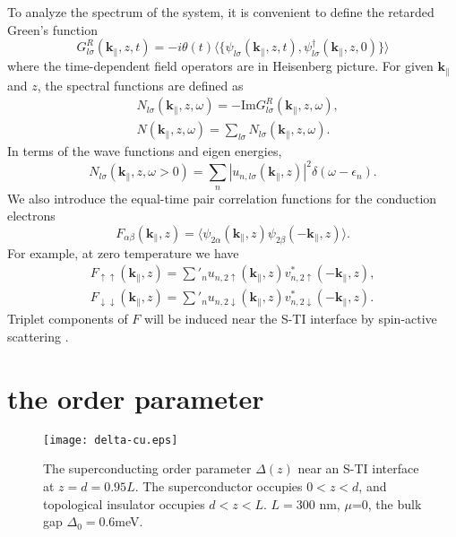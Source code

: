 \documentclass[11pt]{report}
\newcommand{\kperp}{\mathbf{k}_\parallel}
\begin{document}
To analyze the spectrum of the system, it is convenient to define the retarded Green's function
\begin{equation}
G^R_{l\sigma}(\mathbf{k}_\parallel,z,t)=-i\theta(t)\langle \{\psi_{l\sigma}(\mathbf{k}_\parallel,z,t),
\psi^\dagger_{l\sigma}(\mathbf{k}_\parallel,z,0)\}\rangle
\end{equation}
where the time-dependent field operators are in Heisenberg picture. 
For given $\kperp$ and $z$, the spectral functions 
are defined as
\begin{align}
&N_{l\sigma}(\mathbf{k}_\parallel,z,\omega)= -\mathrm{Im}G^R_{l\sigma}(\mathbf{k}_\parallel,z,\omega), \\
&N(\mathbf{k}_\parallel,z,\omega)=\sum_{l\sigma}N_{l\sigma}(\mathbf{k}_\parallel,z,\omega).
\end{align}
In terms of the wave functions and eigen energies, 
\begin{equation}
N_{l\sigma}(\mathbf{k}_\parallel,z,\omega>0)=\sum_n|u_{n,l\sigma}(\mathbf{k}_\parallel,z)|^2\delta(\omega-\epsilon_n). 
\end{equation}
We also introduce the equal-time pair correlation functions
for the conduction electrons 
\begin{equation}
F_{\alpha\beta}(\mathbf{k}_\parallel,z)=\langle \psi_{2\alpha}(\mathbf{k}_\parallel,z) \psi_{2\beta}(-\mathbf{k}_\parallel,z)\rangle.\label{pair-corr}
\end{equation}
For example, at zero temperature we have
\begin{align}
F_{\uparrow\uparrow}(\mathbf{k}_\parallel,z)=\sum'_n u_{n,2\uparrow}(\mathbf{k}_\parallel,z)
v^*_{n,2\uparrow}(-\mathbf{k}_\parallel,z),\\
F_{\downarrow\downarrow}(\mathbf{k}_\parallel,z)=\sum'_n u_{n,2\downarrow}(\mathbf{k}_\parallel,z)
v^*_{n,2\downarrow}(-\mathbf{k}_\parallel,z).
\end{align}
Triplet components of $F$ will be induced near the S-TI interface by spin-active
scattering \cite{zhao}.

\section{the order parameter}

\begin{figure}
\texttt{[image: delta-cu.eps]}
\caption{The superconducting order parameter $\Delta(z)$ near an S-TI interface at $
z=d=0.95L$. The superconductor occupies $0<z<d$, and topological insulator occupies $d<z<L$. 
$L=300$ nm, $\mu$=0, the bulk gap $\Delta_0=$0.6meV. }\label{delta-cu}
\end{figure}
\end{document}
